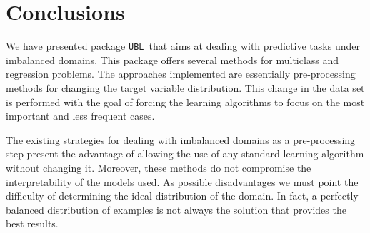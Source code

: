 \documentclass[10pt,a4paper]{article}\usepackage[]{graphicx}\usepackage[]{color}
\newcommand{\UBL}{package \texttt{UBL}\ }
\begin{document}
% 
% 


\section{Conclusions}

We have presented \UBL that aims at dealing with predictive tasks under imbalanced domains. This package offers several methods for multiclass and regression problems. The approaches implemented are essentially pre-processing methods for changing the target variable distribution. This change in the data set is performed with the goal of forcing the learning algorithms to focus on the most important and less frequent cases. 

The existing strategies for dealing with imbalanced domains as a pre-processing step present the advantage of allowing the use of any standard learning algorithm without changing it. Moreover, these methods do not compromise the interpretability of the models used. As possible disadvantages we must point the difficulty of determining the ideal distribution of the domain. In fact, a perfectly balanced distribution of examples is not always the solution that provides the best results.

\newpage



\end{document}
